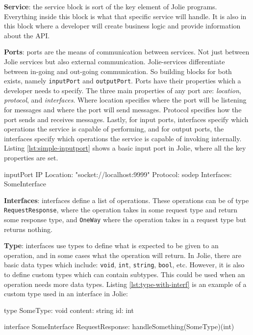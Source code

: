 \textbf{Service}: the service block is sort of the key element of Jolie programs. Everything inside this block is what that specific service will handle. It is also 
in this block where a developer will create business logic and provide information about the API.

\textbf{Ports}: ports are the means of communication between services. Not just between Jolie services but also external communication.
Jolie-services differentiate between in-going and out-going communication. So building blocks for both exists, namely \texttt{inputPort} and \texttt{outputPort}.
Ports have their properties which a developer needs to specify. The three main properties of any port are: \textit{location}, \textit{protocol}, and \textit{interfaces}.
Where location specifies where the port will be listening for messages and where the port will send messages.
Protocol specifies how the port sends and receives messages. Lastly, for input ports, interfaces specify which
operations the service is capable of performing, and for output ports, the interfaces specify which
operations the service is capable of invoking internally. Listing \ref*{lst:simple-inputport} shows a basic input port in Jolie, where all the key properties are set.

\begin{jolisting}[][caption={Simple input port in Jolie},label=lst:simple-inputport]
inputPort IP {
    Location: "socket://localhost:9999"
    Protocol: sodep
    Interfaces: SomeInterface
}
\end{jolisting}


\textbf{Interfaces}: interfaces define a list of operations. These operations can be of type \texttt{RequestResponse}, where the operation takes in some request type and return some response type, 
and \texttt{OneWay} where the operation takes in a request type but returns nothing.

\textbf{Type}: interfaces use types to define what is expected to be given to an operation, and in some cases what the operation will return. In Jolie, there are basic
data types which include: \texttt{void}, \texttt{int}, \texttt{string}, \texttt{bool}, etc. However, it is also to define custom types which can contain subtypes. 
This could be used when an operation needs more data types.
Listing \ref*{lst:type-with-interf} is an example of a custom type used in an interface in Jolie:
\begin{jolisting}[][caption={Custom type used in an interface in Jolie},label=lst:type-with-interf]
type SomeType: void {
    content: string
    id: int
}

interface SomeInterface {
    RequestResponse:
        handleSomething(SomeType)(int)
}
\end{jolisting}

